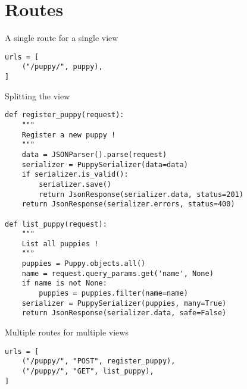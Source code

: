 \section{Routes}
\begin{frame}[fragile]{A single route for a single view}
    \begin{verbatim}
urls = [
    ("/puppy/", puppy),
]
    \end{verbatim}
\end{frame}

\begin{frame}[fragile]{Splitting the view}
    \begin{verbatim}
def register_puppy(request):
    """
    Register a new puppy !
    """
    data = JSONParser().parse(request)
    serializer = PuppySerializer(data=data)
    if serializer.is_valid():
        serializer.save()
        return JsonResponse(serializer.data, status=201)
    return JsonResponse(serializer.errors, status=400)

def list_puppy(request):
    """
    List all puppies !
    """
    puppies = Puppy.objects.all()
    name = request.query_params.get('name', None)
    if name is not None:
        puppies = puppies.filter(name=name)
    serializer = PuppySerializer(puppies, many=True)
    return JsonResponse(serializer.data, safe=False)
    \end{verbatim}
\end{frame}

\begin{frame}[fragile]{Multiple routes for multiple views}
    \begin{verbatim}
urls = [
    ("/puppy/", "POST", register_puppy),
    ("/puppy/", "GET", list_puppy),
]
    \end{verbatim}
\end{frame}
